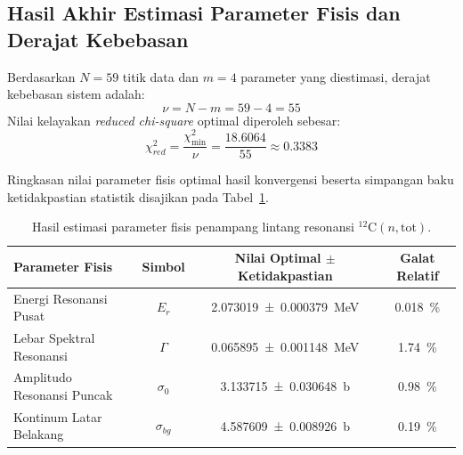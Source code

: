 \subsection*{Hasil Akhir Estimasi Parameter Fisis dan Derajat Kebebasan}
Berdasarkan $N = 59$ titik data dan $m = 4$ parameter yang diestimasi, derajat kebebasan sistem adalah:
\begin{equation}
    \nu = N - m = 59 - 4 = 55
\end{equation}
Nilai kelayakan \textit{reduced chi-square} optimal diperoleh sebesar:
\begin{equation}
    \chi^2_{red} = \frac{\chi^2_{\min}}{\nu} = \frac{18.6064}{55} \approx 0.3383
\end{equation}

Ringkasan nilai parameter fisis optimal hasil konvergensi beserta simpangan baku ketidakpastian statistik disajikan pada Tabel~\ref{tab:parameter_optimal}.

\begin{table}[H]
    \centering
    \small
    \setlength{\tabcolsep}{6pt}
    \caption{Hasil estimasi parameter fisis penampang lintang resonansi $^{12}\text{C}(n,\text{tot})$.}
    \label{tab:parameter_optimal}
    \begin{tabular}{l c c c}
        \toprule
        \textbf{Parameter Fisis} & \textbf{Simbol} & \textbf{Nilai Optimal $\pm$ Ketidakpastian} & \textbf{Galat Relatif} \\
        \midrule
        Energi Resonansi Pusat & $E_r$ & \SI{2.073019 \pm 0.000379}{\mega\electronvolt} & \SI{0.018}{\percent} \\
        Lebar Spektral Resonansi & $\Gamma$ & \SI{0.065895 \pm 0.001148}{\mega\electronvolt} & \SI{1.74}{\percent} \\
        Amplitudo Resonansi Puncak & $\sigma_0$ & \SI{3.133715 \pm 0.030648}{\barn} & \SI{0.98}{\percent} \\
        Kontinum Latar Belakang & $\sigma_{bg}$ & \SI{4.587609 \pm 0.008926}{\barn} & \SI{0.19}{\percent} \\
        \bottomrule
    \end{tabular}
\end{table}


